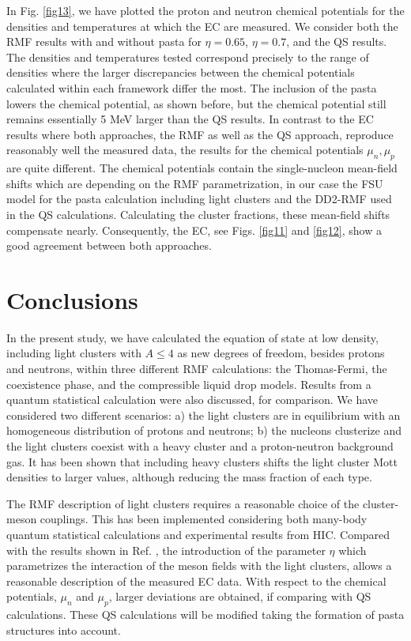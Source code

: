 \documentclass[aps,prc,nofootinbib,twocolumn,showpacs]{revtex4-1}
\begin{document}
 In Fig. \ref{fig13}, we have plotted the proton and neutron
 chemical potentials for the densities and temperatures at which the
 EC are measured. We consider both the RMF results with and without
 pasta for $\eta=0.65$, $\eta=0.7$, and the  QS results. The densities
 and temperatures tested correspond precisely to the range of
 densities where the larger discrepancies between the chemical
 potentials calculated within each framework differ the most. 
 The inclusion  of the pasta lowers the chemical potential, as shown before, but the
 chemical potential still remains essentially 5 MeV larger than the
 QS results. In contrast to the EC results where both approaches, 
 the RMF as well as the QS approach, reproduce reasonably well the 
 measured data, the results for the chemical potentials $\mu_n,\mu_p$
 are quite different. The chemical potentials contain the single-nucleon mean-field shifts which are depending on the RMF parametrization, in our case the FSU model \cite{fsu} for the pasta calculation including light clusters and the DD2-RMF \cite{typel10} used in the QS calculations. Calculating the cluster fractions, these mean-field shifts compensate nearly. Consequently, the EC, see  Figs. \ref{fig11} and \ref{fig12}, show a good agreement between both approaches.






\section{Conclusions} \label{sec:conclusions}



In the present study, we have calculated the equation of state at  low
density, including  light clusters with $A\le4$ as new degrees of freedom, besides
protons and neutrons, within three different RMF calculations:  
the Thomas-Fermi, the coexistence phase, and the compressible liquid drop models. Results from a quantum statistical calculation were also discussed, for comparison.  We have considered two different scenarios: a) the
light clusters are in equilibrium with an homogeneous distribution of
protons and neutrons; b) the nucleons clusterize and the light
clusters coexist with a heavy cluster and a proton-neutron background
gas. It has been shown that including heavy clusters shifts the light
cluster Mott densities to larger values, although reducing the mass
fraction of each type. 



The RMF description of light clusters requires a reasonable choice
of the cluster-meson couplings. This has been implemented considering
both many-body quantum statistical calculations and experimental
results from HIC. Compared with the results shown in Ref. \cite{PCP15}, 
the introduction of the parameter $\eta$ which parametrizes the interaction of the meson fields
with the light clusters, allows  a reasonable description of the measured EC data.
With respect to the chemical potentials, $\mu_n$ and $\mu_p$, larger deviations are obtained, 
if comparing with QS calculations. These QS calculations will be modified
taking the formation of pasta structures into account.
\end{document}
